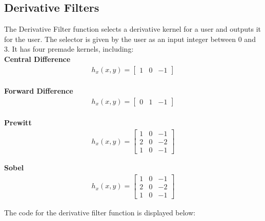 \documentclass{article}
\begin{document}
	\subsection{Derivative Filters}
	
	The Derivative Filter function selects a derivative kernel for a user and outputs it for the user. The selector is given by the user as an input integer between 0 and 3. It has four premade kernels, including:\\
	
	\textbf{Central Difference}\\
	
	\begin{align*}
	h_{x}(x,y) = \left[
	\begin{matrix}
	1 & 0 & -1
	\end{matrix}
	\right]
	\end{align*}\\
	
	\textbf{Forward Difference}\\
	
	\begin{align*}
	h_{x}(x,y) = \left[
	\begin{matrix}
	0 & 1 & -1
	\end{matrix}
	\right]
	\end{align*}\\
	
	\textbf{Prewitt}\\
	
	\begin{align*}
	h_{x}(x,y) = \left[
	\begin{matrix}
	1 & 0 & -1\\
	2 & 0 & -2\\
	1 & 0 & -1
	\end{matrix}
	\right]
	\end{align*}
	
	\textbf{Sobel}\\
	
	\begin{align*}
	h_{x}(x,y) = \left[
	\begin{matrix}
	1 & 0 & -1\\
	2 & 0 & -2\\
	1 & 0 & -1
	\end{matrix}
	\right]
	\end{align*}
	
	The code for the derivative filter function is displayed below:\\
	
\end{document}
